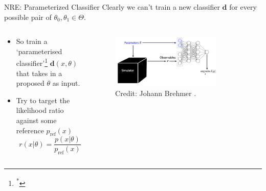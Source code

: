 \documentclass[12pt, aspectratio=169]{beamer}
\let\olditem\item
\renewcommand\item{\olditem\justifying}
\begin{document}
\begin{frame}{NRE: Parameterized Classifier}
    Clearly we can't train a new classifier $\mathbf{d}$ for every possible pair of $\theta_0, \theta_1 \in \Theta$.

    \pause 

    \begin{columns}

        \begin{column}{0.5\textwidth}
            \begin{itemize}[<+->]
                \item So train a `parameterised classifier'\footnote[*]{\textsuperscript{*}\parencite{cranmer_approximating_2016, hermans_likelihood-free_2020}} $\mathbf{d}(x, \theta)$ that takes in a proposed $\theta$ as input.
                \item Try to target the likelihood ratio against some reference $p_\text{ref}(x)$
                $$r(x | \theta) = \frac{p(x|\theta)}{p_{\text{ref}}(x)}$$

            \end{itemize}
        
        \end{column}

        
		\begin{column}{0.5\textwidth}
            \begin{figure}
        		\centering
        		\includegraphics[width=0.8\textwidth]{"images/parameterised_classifier.png"}
                \caption{Credit: Johann Brehmer \parencite{brehmer_slides2022simulation_based_inference_rodem_sinergia_2022pdf_2022}.}
    	    \end{figure}
        \end{column}
    \end{columns}
    
\end{frame}
\end{document}
